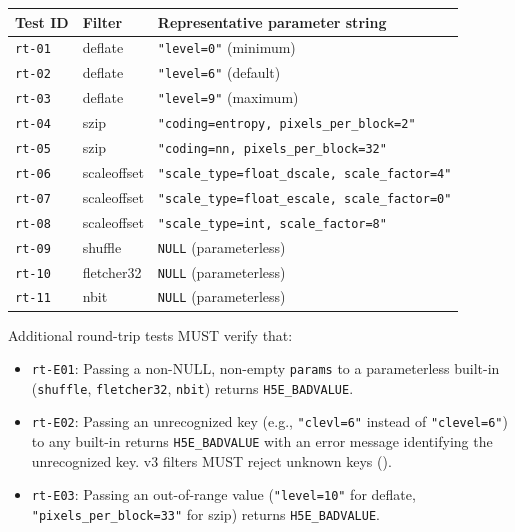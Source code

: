 \documentclass[../HDF5_RFC.tex]{subfiles}
\begin{document}
\begin{center}
\small
\renewcommand{\arraystretch}{1.25}
\begin{tabular}{lll}
\toprule
\textbf{Test ID} & \textbf{Filter} & \textbf{Representative parameter string} \\
\midrule
\texttt{rt-01} & deflate    & \texttt{"level=0"} (minimum) \\
\texttt{rt-02} & deflate    & \texttt{"level=6"} (default) \\
\texttt{rt-03} & deflate    & \texttt{"level=9"} (maximum) \\
\texttt{rt-04} & szip       & \texttt{"coding=entropy, pixels\_per\_block=2"} \\
\texttt{rt-05} & szip       & \texttt{"coding=nn, pixels\_per\_block=32"} \\
\texttt{rt-06} & scaleoffset & \texttt{"scale\_type=float\_dscale, scale\_factor=4"} \\
\texttt{rt-07} & scaleoffset & \texttt{"scale\_type=float\_escale, scale\_factor=0"} \\
\texttt{rt-08} & scaleoffset & \texttt{"scale\_type=int, scale\_factor=8"} \\
\texttt{rt-09} & shuffle    & \texttt{NULL} (parameterless) \\
\texttt{rt-10} & fletcher32 & \texttt{NULL} (parameterless) \\
\texttt{rt-11} & nbit       & \texttt{NULL} (parameterless) \\
\bottomrule
\end{tabular}
\end{center}

\noindent Additional round-trip tests MUST verify that:
\begin{itemize}
\item \texttt{rt-E01}: Passing a non-NULL, non-empty \texttt{params} to a parameterless
  built-in (\texttt{shuffle}, \texttt{fletcher32}, \texttt{nbit}) returns \texttt{H5E\_BADVALUE}.
\item \texttt{rt-E02}: Passing an unrecognized key (e.g., \texttt{"clevl=6"}
  instead of \texttt{"clevel=6"}) to any built-in returns
  \texttt{H5E\_BADVALUE} with an error message identifying the unrecognized key.
  v3 filters MUST reject unknown keys ().
\item \texttt{rt-E03}: Passing an out-of-range value (\texttt{"level=10"} for deflate,
  \texttt{"pixels\_per\_block=33"} for szip) returns \texttt{H5E\_BADVALUE}.
\end{itemize}
\end{document}
